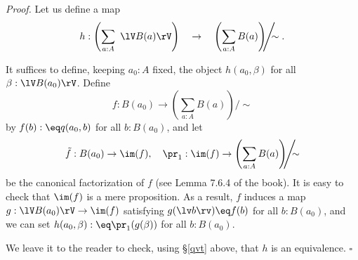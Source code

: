 \documentclass[12pt]{article}
\begin{document}
\nn\emph{Proof.} Let us define a map 
$$
h:\left(\sum_{a:A}\ \lV B(a)\rV\right)\quad\to\quad\left(\sum_{a:A}B(a)\right)\!\!\!\Bigg/\!\!\!\!\sim.
$$ 

It suffices to define, keeping $a_0:A$ fixed, the object $h(a_0,\beta)$ for all $\beta:\lV B(a_0)\rV$. Define 
$$
f:B(a_0)\to\left(\sum_{a:A}B(a)\right)\!\!\!\Bigg/\!\!\!\!\sim
$$ 
by $f(b):\eq q(a_0,b)$ for all $b:B(a_0)$, and let 
$$
\tilde f:B(a_0)\to\im(f),\quad\pr_1:\im(f)\to\left(\sum_{a:A}B(a)\right)\!\!\!\Bigg/\!\!\!\!\sim
$$ 
be the canonical factorization of $f$ (see Lemma 7.6.4 of the book). It is easy to check that $\im(f)$ is a mere proposition. As a result, $f$ induces a map $g:\lV B(a_0)\rV\to\im(f)$ satisfying $g(\lv b\rv)\eq f(b)$ for all $b:B(a_0)$, and we can set $h(a_0,\beta):\eq\pr_1(g(\beta))$ for all $b:B(a_0)$.

We leave it to the reader to check, using \S\ref{qvt} above, that $h$ is an equivalence. $\square$

\begin{comment}

This is about the sentence ``The obvious candidate for the coequalizer of the kernel pair of $f:A\to B$ is the image of f, as defined in \S7.6'' a few paragraphs before Lemma 10.1.1. (It's clear from the context that $A$ and $B$ are sets.) Let's show that this obvious candidate is the good one. It suffices to prove the statement

Let $A$ and $B$ be sets, let $f:A\to B$ be a surjection, define the equivalence relation $\sim$ on $A$ by 
$$
a\sim a'\text{ if and only if }f(a)=f(a'),
$$
let $A/\!\!\sim$ be the quotient as defined at the beginning of \S6.10, and let $q:A\to A/\!\!\sim$ be the canonical projection. Then there is a map $g:B\to A/\!\!\sim$ such that $g\ci f=q$:
$$
\xymatrix{
&A\ar[dl]_f\ar[dr]^q\\
B\ar[rr]_g&&A/\!\!\sim.
}
$$ 

Proof. Given $b:B$ we define the sets and maps 
$$
\xymatrix{
\fib_f(b)\ar[rr]^{\pr_1}\ar[d]_{\lv-\rv}\ar[dr]^{q_b}&&A\ar[d]^q\\ 
\lV\fib_f(b)\rV\ar[r]_h&\fib_f(b)/\!\!\sim_b\ar[r]_{\ \ k}&A/\!\!\sim
}
$$ 
as follows: Let $\sim_b$ be the equivalence relation defined on $\fib_f(b)$ by the requirement that $x\sim_b y$ for all $x,y:\fib_f(b)$, and $q_b$ the canonical projection; and note that $q_b$ induces $h$ and that $q\ci\pr_1$ induces $k$. The above diagram having been constructed, we set $g(b):\eq k(h(x))$, with $x:\lV\fib_f(b)\rV$. The equality $g\ci f=q$ is easily checked. $\square$

\end{comment}
\end{document}
